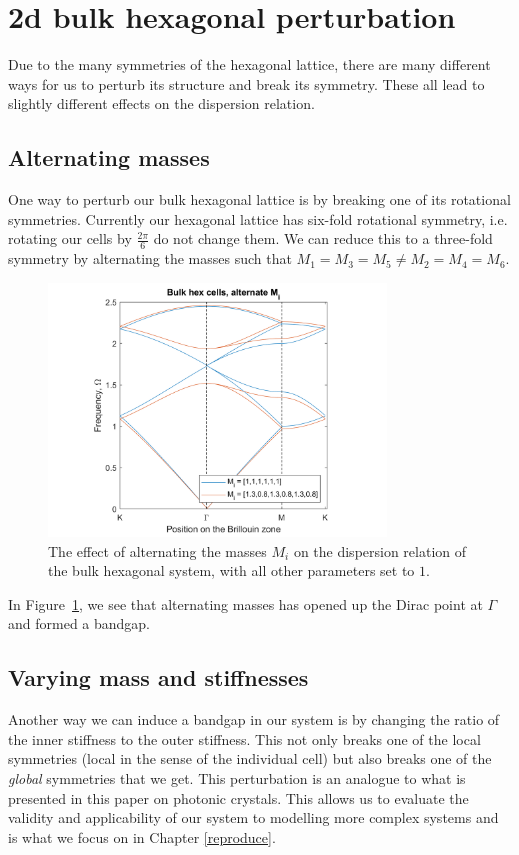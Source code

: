 \section{2d bulk hexagonal perturbation}
Due to the many symmetries of the hexagonal lattice, there are many different
ways for us to perturb its structure and break its symmetry. These all lead to
slightly different effects on the dispersion relation.

\subsection{Alternating masses}
One way to perturb our bulk hexagonal lattice is by breaking one of its
rotational symmetries. Currently our hexagonal lattice has six-fold rotational
symmetry, i.e. rotating our cells by $\frac{2\pi}{6}$ do not change them. We can
reduce this to a three-fold symmetry by alternating the masses such that
$M_1=M_3=M_5 \neq M_2=M_4=M_6$.

\begin{figure}[!h]
\centering
\includegraphics[width=0.8\textwidth]{imgs/hexperturbM.png}
\caption{\label{fig:hexM} The effect of alternating the masses $M_i$ on the
  dispersion relation of the bulk hexagonal system, with all other parameters
  set to $1$.}
\end{figure}

In Figure~\ref{fig:hexM}, we see that alternating masses has opened up the
Dirac point at $\Gamma$ and formed a bandgap.

\subsection{Varying mass and stiffnesses}
Another way we can induce a bandgap in our system is by changing the ratio of
the inner stiffness to the outer stiffness. This not only breaks one of the
local symmetries (local in the sense of the individual cell) but also breaks
one of the \textit{global} symmetries that we get. This perturbation is an
analogue to what is presented in this paper on photonic crystals.\cite{wuandhu}
This allows us to evaluate the validity and applicability of our system to
modelling more complex systems and is what we focus on in Chapter
\ref{reproduce}.

